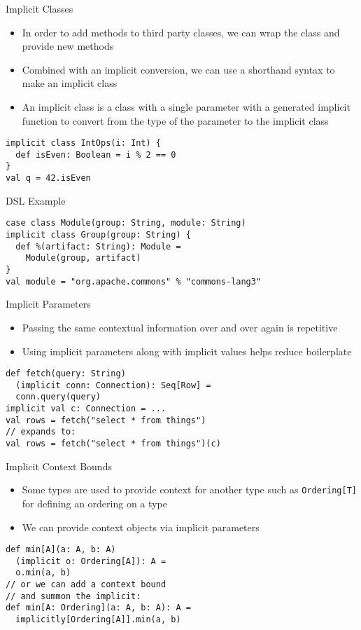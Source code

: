 \documentclass{beamer}
\begin{document}
\begin{frame}[fragile]{Implicit Classes}
\begin{itemize}
\item In order to add methods to third party classes, we can wrap the class and
provide new methods
\item Combined with an implicit conversion, we can use a shorthand syntax to make
an implicit class
\item An implicit class is a class with a single parameter with a generated implicit
function to convert from the type of the parameter to the implicit class
\end{itemize}
\begin{lstlisting}
implicit class IntOps(i: Int) {
  def isEven: Boolean = i % 2 == 0
}
val q = 42.isEven
\end{lstlisting}
\end{frame}

\begin{frame}[fragile]{DSL Example}
\begin{lstlisting}
case class Module(group: String, module: String)
implicit class Group(group: String) {
  def %(artifact: String): Module =
    Module(group, artifact)
}
val module = "org.apache.commons" % "commons-lang3"
\end{lstlisting}
\end{frame}

\begin{frame}[fragile]{Implicit Parameters}
\begin{itemize}
\item Passing the same contextual information over and over again is repetitive
\item Using implicit parameters along with implicit values helps reduce boilerplate
\end{itemize}
\begin{lstlisting}
def fetch(query: String)
  (implicit conn: Connection): Seq[Row] =
  conn.query(query)
implicit val c: Connection = ...
val rows = fetch("select * from things")
// expands to:
val rows = fetch("select * from things")(c)
\end{lstlisting}
\end{frame}

\begin{frame}[fragile]{Implicit Context Bounds}
\begin{itemize}
\item Some types are used to provide context for another type such as
\lstinline{Ordering[T]} for defining an ordering on a type
\item We can provide context objects via implicit parameters
\end{itemize}
\begin{lstlisting}
def min[A](a: A, b: A)
  (implicit o: Ordering[A]): A =
  o.min(a, b)
// or we can add a context bound
// and summon the implicit:
def min[A: Ordering](a: A, b: A): A =
  implicitly[Ordering[A]].min(a, b)
\end{lstlisting}
\end{frame}
\end{document}
